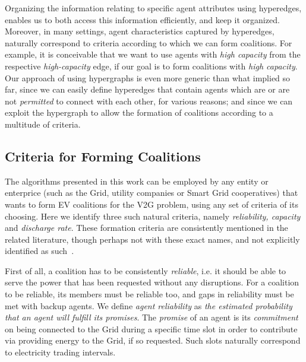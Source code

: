 


Organizing the information relating to specific agent attributes using hyperedges, enables us to both access this information efficiently, and keep it organized.
Moreover, in many settings, agent characteristics captured by hyperedges, naturally correspond to criteria according to which we can form coalitions.
For example, it is conceivable that we want to use agents with {\em high capacity} from the respective {\em high-capacity} edge, if our goal is to form coalitions with {\em high capacity}. Our approach of using hypergraphs is even more generic than what implied so far, since we can easily define hyperedges that contain agents which are or are not {\em permitted} to connect with each other, for various reasons; and since we can exploit the hypergraph to allow the formation of coalitions according to a multitude of criteria.

\subsection{Criteria for Forming Coalitions}
\label{subsec:criteria}

The algorithms presented in this work can be employed by any entity or enterprice (such as the Grid, utility companies or Smart Grid cooperatives) that wants to form EV coalitions for the V2G problem, using any set of criteria of its choosing. Here we identify three such natural criteria, namely \textit{reliability, capacity} and \textit{discharge rate}. These formation criteria are consistently mentioned in the related literature, though perhaps not with these exact names, and not explicitly identified as such~\cite{kamboj2010exploring,kamboj2011deploying,valogianni2014effective}.

First of all, a coalition has to be consistently {\em reliable}, i.e. it should be able to serve the power that has been requested without any disruptions. For a coalition to be reliable, its members must be reliable too, and gaps in reliability must be met with backup agents. We define {\em agent reliability} as {\em the estimated probability that an agent will fulfill its promises}. The {\em promise} of an agent is its {\em commitment} on being connected to the Grid during a specific time slot in order to contribute via providing energy to the Grid, if so requested. Such slots naturally correspond to electricity trading intervals.

